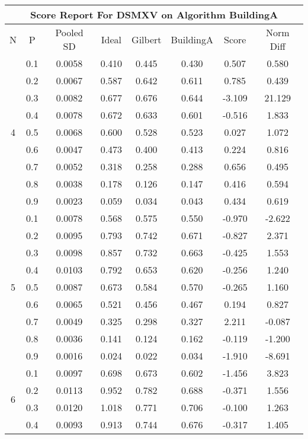 \documentclass[11pt,a4paper]{report}
\begin{document}
\begin{longtable}{ | c | c || c | c | c | c | c | c | }
\hline
\multicolumn{8}{|c|}{ Score Report For DSMXV on Algorithm BuildingA} \\
\hline
N & P & Pooled SD &  Ideal &  Gilbert & BuildingA  & Score & Norm Diff \\
 \hline
 \hline
 \endhead
\multirow{9}{*}{4} & 0.1 & 0.0058 & 0.410 & 0.445 & 0.430 & 0.507 & 0.580 \\
 & 0.2 & 0.0067 & 0.587 & 0.642 & 0.611 & 0.785 & 0.439 \\
 & 0.3 & 0.0082 & 0.677 & 0.676 & 0.644 & -3.109 & 21.129 \\
 & 0.4 & 0.0078 & 0.672 & 0.633 & 0.601 & -0.516 & 1.833 \\
 & 0.5 & 0.0068 & 0.600 & 0.528 & 0.523 & 0.027 & 1.072 \\
 & 0.6 & 0.0047 & 0.473 & 0.400 & 0.413 & 0.224 & 0.816 \\
 & 0.7 & 0.0052 & 0.318 & 0.258 & 0.288 & 0.656 & 0.495 \\
 & 0.8 & 0.0038 & 0.178 & 0.126 & 0.147 & 0.416 & 0.594 \\
 & 0.9 & 0.0023 & 0.059 & 0.034 & 0.043 & 0.434 & 0.619 \\
 \hline
\multirow{9}{*}{5} & 0.1 & 0.0078 & 0.568 & 0.575 & 0.550 & -0.970 & -2.622 \\
 & 0.2 & 0.0095 & 0.793 & 0.742 & 0.671 & -0.827 & 2.371 \\
 & 0.3 & 0.0098 & 0.857 & 0.732 & 0.663 & -0.425 & 1.553 \\
 & 0.4 & 0.0103 & 0.792 & 0.653 & 0.620 & -0.256 & 1.240 \\
 & 0.5 & 0.0087 & 0.673 & 0.584 & 0.570 & -0.265 & 1.160 \\
 & 0.6 & 0.0065 & 0.521 & 0.456 & 0.467 & 0.194 & 0.827 \\
 & 0.7 & 0.0049 & 0.325 & 0.298 & 0.327 & 2.211 & -0.087 \\
 & 0.8 & 0.0036 & 0.141 & 0.124 & 0.162 & -0.119 & -1.200 \\
 & 0.9 & 0.0016 & 0.024 & 0.022 & 0.034 & -1.910 & -8.691 \\
 \hline
\multirow{9}{*}{6} & 0.1 & 0.0097 & 0.698 & 0.673 & 0.602 & -1.456 & 3.823 \\
 & 0.2 & 0.0113 & 0.952 & 0.782 & 0.688 & -0.371 & 1.556 \\
 & 0.3 & 0.0120 & 1.018 & 0.771 & 0.706 & -0.100 & 1.263 \\
 & 0.4 & 0.0093 & 0.913 & 0.744 & 0.676 & -0.317 & 1.405 \\

\end{longtable}
\end{document}
